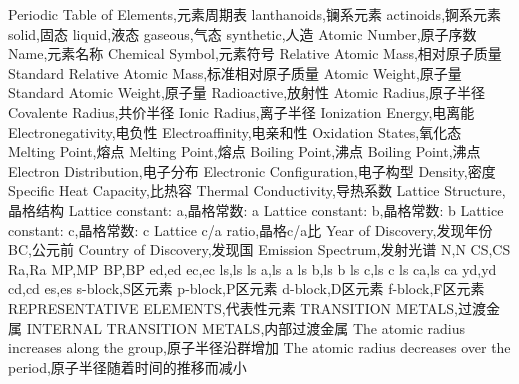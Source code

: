 %
%
%
%
%
Periodic Table of Elements,元素周期表
lanthanoids,镧系元素
actinoids,锕系元素
solid,固态
liquid,液态
gaseous,气态
synthetic,人造
Atomic Number,原子序数
Name,元素名称
Chemical Symbol,元素符号
Relative Atomic Mass,相对原子质量
Standard Relative Atomic Mass,标准相对原子质量
Atomic Weight,原子量
Standard Atomic Weight,原子量
Radioactive,放射性
Atomic Radius,原子半径
Covalente Radius,共价半径
Ionic Radius,离子半径
Ionization Energy,电离能
Electronegativity,电负性
Electroaffinity,电亲和性
Oxidation States,氧化态
Melting Point,熔点
Melting Point,熔点
Boiling Point,沸点
Boiling Point,沸点
Electron Distribution,电子分布
Electronic Configuration,电子构型
Density,密度
Specific Heat Capacity,比热容
Thermal Conductivity,导热系数
Lattice Structure,晶格结构
Lattice constant: a,晶格常数: a
Lattice constant: b,晶格常数: b
Lattice constant: c,晶格常数: c
Lattice c/a ratio,晶格c/a比
Year of Discovery,发现年份
BC,公元前
Country of Discovery,发现国
Emission Spectrum,发射光谱
N,N
CS,CS
Ra,Ra
MP,MP
BP,BP
ed,ed
ec,ec
ls,ls
ls a,ls a
ls b,ls b
ls c,ls c
ls ca,ls ca
yd,yd
cd,cd
es,es
s-block,S区元素
p-block,P区元素
d-block,D区元素
f-block,F区元素
REPRESENTATIVE ELEMENTS,代表性元素
TRANSITION METALS,过渡金属
INTERNAL TRANSITION METALS,内部过渡金属
The atomic radius increases along the group,原子半径沿群增加
The atomic radius decreases over the period,原子半径随着时间的推移而减小
